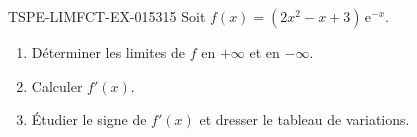 \begin{exercice}{TSPE-LIMFCT-EX-015}{3}{15}
Soit $f(x) = (2x^2 - x + 3)\,\mathrm{e}^{-x}$.
\begin{enumerate}
  \item Déterminer les limites de $f$ en $+\infty$ et en $-\infty$.
  \item Calculer $f'(x)$.
  \item Étudier le signe de $f'(x)$ et dresser le tableau de variations.
\end{enumerate}
\end{exercice}
